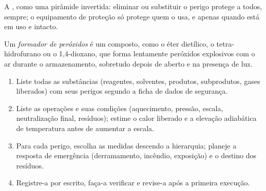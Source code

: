 \begin{omfigure}

{\small A , como uma pirâmide invertida: eliminar ou substituir
o perigo protege a todos, sempre; o equipamento de proteção só protege quem
o usa, e apenas quando está em uso e intacto.}
\end{omfigure}

\begin{definition}\label{def:b3:lab-techniques-3:peroxide}
Um \emph{formador de peróxidos} é um composto, como o éter
dietílico, o tetra-hidrofurano ou o 1,4-dioxano, que forma lentamente peróxidos explosivos
com o ar durante o armazenamento, sobretudo depois de aberto e na presença de luz.
\end{definition}

\begin{method}\label{met:b3:lab-techniques-3:risk-assessment}
\begin{enumerate}
  \item Liste todas as substâncias (reagentes, solventes, produtos, subprodutos, gases
        liberados) com seus perigos segundo a ficha de dados de segurança.
  \item Liste as operações e suas condições (aquecimento, pressão, escala,
        neutralização final, resíduos); estime o calor liberado e a elevação adiabática de temperatura
        antes de aumentar a escala.
  \item Para cada perigo, escolha as medidas descendo a hierarquia; planeje a resposta
        de emergência (derramamento, incêndio, exposição) e o destino dos resíduos.
  \item Registre-a por escrito, faça-a verificar e revise-a após a primeira execução.
\end{enumerate}
\end{method}

